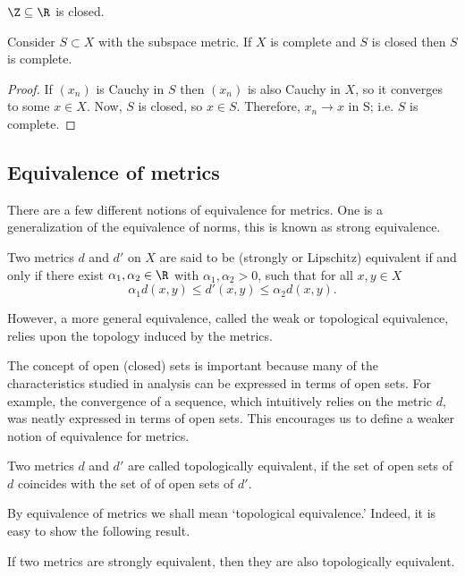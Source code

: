 \begin{ncor}
  $\Z \subseteq \R$ is closed.
\end{ncor}

\begin{nprop}
  Consider $S \subset X$ with the subspace metric. If $X$ is complete and $S$ is closed then $S$ is complete.
\end{nprop}
\begin{proof}
  If $(x_n)$ is Cauchy in $S$ then $(x_n)$ is also Cauchy in $X$, so it converges to some $x \in X$. Now, $S$ is closed, so $x \in S$. Therefore, $x_n \to x$ in S; i.e. $S$ is complete.
\end{proof}

\subsection{Equivalence of metrics}
There are a few different notions of equivalence for metrics. One is a generalization of the equivalence of norms, this is known as strong equivalence.
\begin{ndfn}
  Two metrics $d$ and $d'$ on $X$ are said to be (strongly or Lipschitz) equivalent if and only if there exist $\alpha_1, \alpha_2 \in \R$ with $\alpha_1, \alpha_2 > 0$, such that for all $x,y \in X$
  \begin{equation*}
    \alpha_1 d(x,y) \leq d'(x,y) \leq \alpha_2 d(x,y).
  \end{equation*}
\end{ndfn}
However, a more general equivalence, called the weak or topological equivalence, relies upon the topology induced by the metrics.

The concept of open (closed) sets is important because many of the characteristics studied in analysis can be expressed in terms of open sets. For example, the convergence of a sequence, which intuitively relies on the metric $d$, was neatly expressed in terms of open sets. This encourages us to define a weaker notion of equivalence for metrics.
\begin{ndfn}
  Two metrics $d$ and $d'$ are called topologically equivalent, if the set of open sets of $d$ coincides with the set of of open sets of $d'$.
\end{ndfn}
By equivalence of metrics we shall mean `topological equivalence.' Indeed, it is easy to show the following result.
\begin{nprop}
  If two metrics are strongly equivalent, then they are also topologically equivalent.
\end{nprop}

